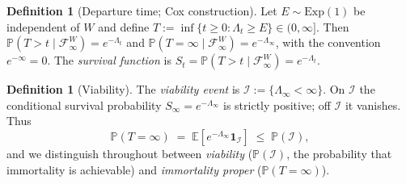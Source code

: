 \documentclass[11pt]{article}
\numberwithin{equation}{section}
\theoremstyle{plain}
\theoremstyle{definition}
\newtheorem{definition}[theorem]{Definition}
\theoremstyle{remark}
\newcommand{\E}{\mathbb{E}}
\newcommand{\PP}{\mathbb{P}}
\newcommand{\one}{\mathbf{1}}
\newcommand{\Imm}{\mathcal{I}}
\newcommand{\Fc}{\mathcal{F}}
\begin{document}
\begin{definition}[Departure time; Cox construction]\label{sh:def:cox}
Let $E\sim\mathrm{Exp}(1)$ be independent of $W$ and define
$T:=\inf\{t\ge0:\Lambda_t\ge E\}\in(0,\infty]$. Then
$\PP(T>t\mid\Fc^W_\infty)=e^{-\Lambda_t}$ and
$\PP(T=\infty\mid\Fc^W_\infty)=e^{-\Lambda_\infty}$, with the convention
$e^{-\infty}=0$. The \emph{survival function} is
$S_t=\PP(T>t\mid\Fc^W_\infty)=e^{-\Lambda_t}$.
\end{definition}

\begin{definition}[Viability]\label{sh:def:viab}
The \emph{viability event} is $\Imm:=\{\Lambda_\infty<\infty\}$. On $\Imm$
the conditional survival probability $S_\infty=e^{-\Lambda_\infty}$ is
strictly positive; off $\Imm$ it vanishes. Thus
\begin{equation}\label{sh:eq:twotier}
\PP(T=\infty)\;=\;\E\!\left[e^{-\Lambda_\infty}\one_\Imm\right]
\;\le\;\PP(\Imm),
\end{equation}
and we distinguish throughout between \emph{viability} ($\PP(\Imm)$, the
probability that immortality is achievable) and \emph{immortality proper}
($\PP(T=\infty)$).
\end{definition}
\end{document}

